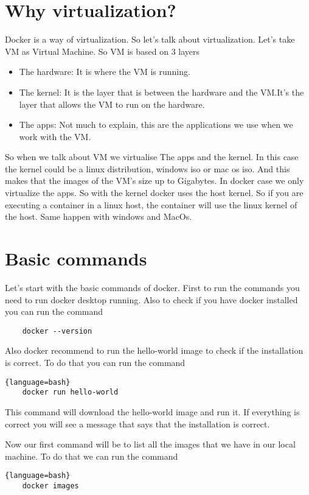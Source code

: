 \documentclass{article}
\begin{document}
\section*{Why virtualization?}
Docker is a way of virtualization. So let's talk about virtualization. Let's take VM as Virtual Machine. 
So VM is based on 3 layers 
\begin{itemize}
    \item The hardware: It is where the VM is running.
    \item The kernel: It is the layer that is between the hardware and the VM.It's the layer that allows the VM to run on the hardware.
    \item The apps: Not much to explain, this are the applications we use when we work with the VM.
\end{itemize}
So when we talk about VM we virtualise The apps and the kernel. In this case the kernel could be a linux distribution, windows iso or mac os iso. 
And this makes that the images of the VM's size up to Gigabytes. In docker case we only virtualize the apps. So with the kernel docker uses
the host kernel. So if you are executing a container in a linux host, the container will use the linux kernel of the host. 
Same happen with windows and MacOs. 


\section*{Basic commands}
Let's start with the basic commands of docker. First to run the commands you need to run docker desktop running. Also to check if 
you have docker installed you can run the command
\begin{lstlisting}
    docker --version
\end{lstlisting}

Also docker recommend to run the hello-world image to check if the installation is correct. To do that you can run the command
\begin{lstlisting}{language=bash}
    docker run hello-world
\end{lstlisting}
 
This command will download the hello-world image and run it. If everything is correct you will see a message that says that the installation 
is correct.

Now our first command will be to list all the images that we have in our local machine. To do that we can run the command
\begin{lstlisting}{language=bash}
    docker images
\end{lstlisting}
\end{document}

